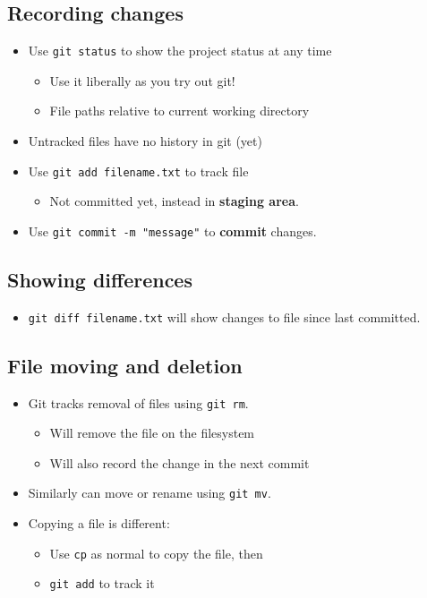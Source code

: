 \documentclass[slides]{pgnotes}
\begin{document}
\subsection{Recording changes}

\begin{itemize}
\item Use \texttt{git status} to show the project status at any time
  \begin{itemize}
  \item Use it liberally as you try out git!
  \item File paths relative to current working directory
  \end{itemize}
\item Untracked files have no history in git (yet)
\item Use \texttt{git add filename.txt} to track file
  \begin{itemize}
  \item Not committed yet, instead in \textbf{staging area}.
  \end{itemize}
\item Use \texttt{git commit -m "message"} to \textbf{commit} changes.
\end{itemize}



\subsection{Showing differences}

\begin{itemize}
\item \texttt{git diff filename.txt} will show changes to file since last committed.
\end{itemize}

\subsection{File moving and deletion}

\begin{itemize}
\item Git tracks removal of files using \texttt{git rm}.
  \begin{itemize}
  \item Will remove the file on the filesystem
  \item Will also record the change in the next commit
  \end{itemize}
\item Similarly can move or rename using \texttt{git mv}.
\item Copying a file is different:
  \begin{itemize}
  \item Use \texttt{cp} as normal to copy the file, then
  \item \texttt{git add} to track it
  \end{itemize}
\end{itemize}
\end{document}
